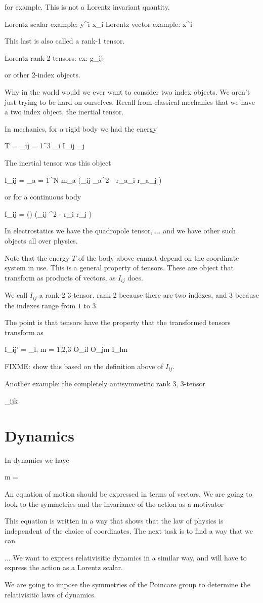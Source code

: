 for example.  This is not a Lorentz invariant quantity.

Lorentz scalar example: y^i x_i
Lorentz vector example: x^i

This last is also called a rank-1 tensor.

Lorentz rank-2 tensors: ex: g_{ij}

or other 2-index objects.

Why in the world would we ever want to consider two index objects.  We aren't just trying to be hard on ourselves.  Recall from classical mechanics that we have a two index object, the inertial tensor.

In mechanics, for a rigid body we had the energy

T = \sum_{ij = 1}^3 \Omega_i I_{ij} \Omega_j

The inertial tensor was this object 

I_{ij} = \sum_{a = 1}^N m_a \left(\delta_{ij} \Br_a^2 - r_{a_i} r_{a_j} \right)

or for a continuous body

I_{ij} = \int \rho(\Br) \left(\delta_{ij} \Br^2 - r_{i} r_{j} \right)

In electrostatics we have the quadropole tensor, ... and we have other such objects all over physics.

Note that the energy $T$ of the body above cannot depend on the coordinate system in use.  This is a general property of tensors.  These are object that transform as products of vectors, as $I_{ij}$ does.  

We call $I_{ij}$ a rank-2 3-tensor.  rank-2 because there are two indexes, and 3 because the indexes range from $1$ to $3$.

The point is that tensors have the property that the transformed tensors transform as

I_{ij}' = \sum_{l, m = 1,2,3} O_{il} O_{jm} I_{lm}

FIXME: show this based on the definition above of $I_{ij}$.

Another example: the completely antisymmetric rank 3, 3-tensor

\epsilon_{ijk}

\section{Dynamics}

In dynamics we have 

m \ddot{\Br} = \Bf

An equation of motion should be expressed in terms of vectors.  We are going to look to the symmetries and the invariance of the action as a motivator

This equation is written in a way that shows that the law of physics is independent of the choice of coordinates.  The next task is to find a way that we can 

...
We want to express relativisitic dynamics in a similar way, and will have to express the action as a Lorentz scalar.

We are going to impose the symmetries of the Poincare group to determine the relativisitic laws of dynamics.

\EndArticle

